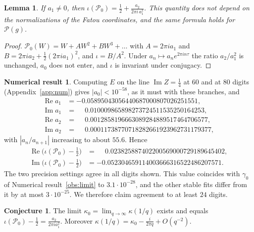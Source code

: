\documentclass[11pt]{amsart}
\newtheorem{lemma}[theorem]{Lemma}
\theoremstyle{definition}
\newtheorem{conjecture}[theorem]{Conjecture}
\newtheorem{observation}[theorem]{Numerical result}
\theoremstyle{remark}
\newcommand{\PP}{\mathcal{P}_0}
\begin{document}
\begin{lemma}\label{thm:horn-index}
If $a_1\ne0$, then $\displaystyle\iota(\PP)=\frac12+\frac{a_2}{2\pi i\,a_1^2}$. This quantity does not depend on the normalizations of the Fatou coordinates, and the same formula holds for $\mathcal P(g)$.
\end{lemma}

\begin{proof}
$\PP(W)=W+AW^2+BW^3+\dots$ with $A=2\pi ia_1$ and $B=2\pi ia_2+\frac12(2\pi ia_1)^2$, and $\iota=B/A^2$. Under $a_n\mapsto a_ne^{2\pi in\tau}$ the ratio $a_2/a_1^2$ is unchanged, $a_0$ does not enter, and $\iota$ is invariant under conjugacy.
\end{proof}

\begin{observation}\label{obs:identity}
Computing $E$ on the line $\operatorname{Im}Z=\frac14$ at 60 and at 80 digits (Appendix~\ref{app:num}) gives $|a_0|<10^{-58}$, as it must with these branches, and
\begin{align*}
\operatorname{Re}a_1&=-0.05895043056440687000807026251551,\\
\operatorname{Im}a_1&=\phantom{-}0.010009865898273724511535250164253,\\
\operatorname{Re}a_2&=\phantom{-}0.0012858196663089284889517464706577,\\
\operatorname{Im}a_2&=\phantom{-}0.00011738770718282661923962731179377,
\end{align*}
with $|a_n/a_{n+1}|$ increasing to about $55.6$. Hence
\begin{align*}
\operatorname{Re}\bigl(\iota(\PP)-\tfrac12\bigr)&=\phantom{-}0.023825887402200569000729189645402,\\
\operatorname{Im}\bigl(\iota(\PP)-\tfrac12\bigr)&=-0.052304659114003666316522486207571.
\end{align*}
The two precision settings agree in all digits shown. This value coincides with $\gamma_0$ of Numerical result~\ref{obs:limit} to $3.1\cdot10^{-28}$, and the other stable fits differ from it by at most $3\cdot10^{-25}$. We therefore claim agreement to at least $24$ digits.
\end{observation}

\begin{conjecture}\label{conj:main}
The limit $\kappa_0=\lim_{q\to\infty}\kappa(1/q)$ exists and equals $\iota(\PP)-\frac12=\frac{a_2}{2\pi ia_1^2}$. Moreover $\kappa(1/q)=\kappa_0-\frac{i}{2\pi q}+O(q^{-2})$.
\end{conjecture}
\end{document}
